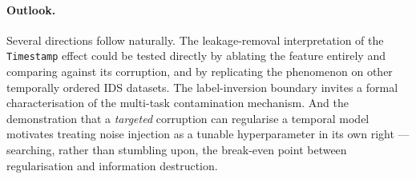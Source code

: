 \documentclass[../main.tex]{subfiles}
\begin{document}
\paragraph{Outlook.}
Several directions follow naturally. The leakage-removal interpretation of the \texttt{Timestamp} effect could be tested directly by ablating the feature entirely and comparing against its corruption, and by replicating the phenomenon on other temporally ordered IDS datasets. The label-inversion boundary invites a formal characterisation of the multi-task contamination mechanism. And the demonstration that a \emph{targeted} corruption can regularise a temporal model motivates treating noise injection as a tunable hyperparameter in its own right --- searching, rather than stumbling upon, the break-even point between regularisation and information destruction.
\end{document}
